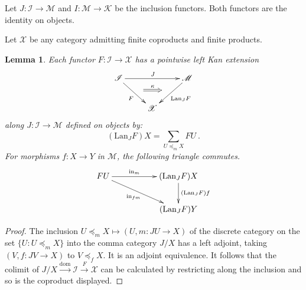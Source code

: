 \documentclass[a4paper,12pt,reqno]{amsart}
\newtheorem{lemma}[theorem]{Lemma}
\theoremstyle{definition}
\theoremstyle{fact}
\theoremstyle{genquest}
\theoremstyle{step}
\newcommand{\dd}{\colon}
\newcommand{\lra}{\longrightarrow}
\newcommand{\ra}{\rightarrow}
\def\CI{{\mathscr I}}
\def\CK{{\mathscr K}}
\def\CM{{\mathscr M}}
\def\CX{{\mathscr X}}
\begin{document}
Let $J\dd \CI \ra \CM$ and $I \dd \CM \ra \CK$ be the inclusion functors. 
Both functors are the identity on objects.

Let $\CX$ be any category admitting finite coproducts and finite products.

\begin{lemma}\label{leftKan}
Each functor $F\dd \CI \ra \CX$ has a pointwise left Kan extension
\begin{equation}
\begin{aligned}
\xymatrix{
\CI \ar[rd]_{F}^(0.5){\phantom{a}}="1" \ar[rr]^{J}  && \CM \ar[ld]^{\mathrm{Lan}_JF}_(0.5){\phantom{a}}="2" \ar@{=>}"1";"2"^-{\kappa}
\\
& \CX 
}
\end{aligned}
\end{equation} 
along $J\dd \CI \ra \CM$ defined on objects by:
$$(\mathrm{Lan}_JF)X = \sum_{U\preceq_m X}FU \ .$$
For morphisms $f \dd X\ra Y$ in $\CM$, the following triangle commutes.
\begin{equation}
\begin{aligned}
\xymatrix{
FU \ar[drr]_-{\mathrm{in}_{fm}} \ar[rr]^-{\mathrm{in}_m} && (\mathrm{Lan}_JF)X \ar[d]^-{(\mathrm{Lan}_JF)f} \\
&& (\mathrm{Lan}_JF)Y}
\end{aligned}
\end{equation}
\end{lemma}
\begin{proof}
The inclusion $U\preceq_m X \mapsto (U, m \dd JU\ra X)$ 
of the discrete category on the set $\{U \dd U\preceq_m X\}$ into the comma category $J/X$ has a left adjoint, taking $(V,f\dd JV\ra X)$ to $V\preceq_f X$.
It is an adjoint equivalence. It follows that the colimit of 
$J/X \stackrel{\mathrm{dom}}\lra \CI \stackrel{F}\lra \CX$
can be calculated by restricting along the inclusion and so is the coproduct displayed.
\end{proof}
\end{document}
